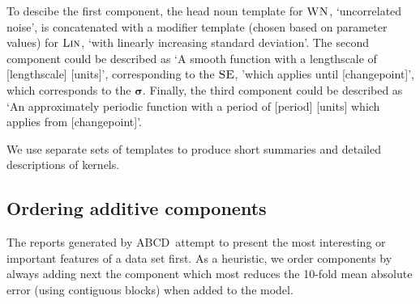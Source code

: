 \documentclass[letterpaper]{article}
\def\eg{e.g.\ }
\newcommand{\procedurename}{ABCD\ }
\begin{document}
To descibe the first component, the head noun template for ${\textsc{WN}}$, `uncorrelated noise', is concatenated with a modifier template (chosen based on parameter values) for ${\textsc{Lin}}$, `with linearly increasing standard deviation'.
%
The second component could be described as `A smooth function with a lengthscale of [lengthscale] [units]', corresponding to the ${\textsc{SE}}$, 'which applies until [changepoint]', which corresponds to the $\boldsymbol{\sigma}$.
%
Finally, the third component could be described as `An approximately periodic function with a period of [period] [units] which applies from [changepoint]'.



We use separate sets of templates to produce short summaries and detailed descriptions of kernels.

\subsection{Ordering additive components}

The reports generated by \procedurename attempt to present the most interesting or important features of a data set first.
As a heuristic, we order components by always adding next the component which most reduces the 10-fold mean absolute error (using contiguous blocks) when added to the model.



\end{document}

